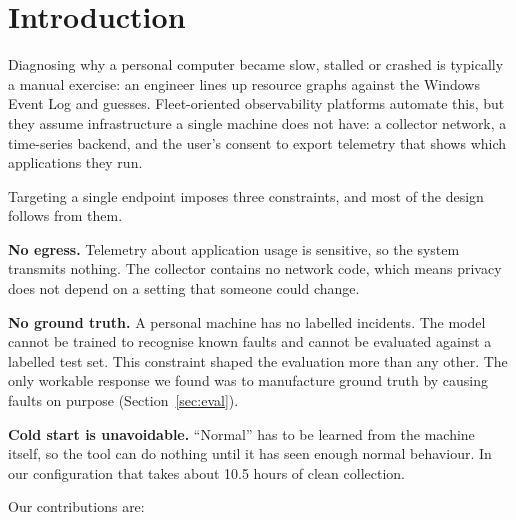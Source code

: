 \documentclass[conference]{IEEEtran}
\begin{document}
\section{Introduction}

Diagnosing why a personal computer became slow, stalled or crashed is
typically a manual exercise: an engineer lines up resource graphs against the
Windows Event Log and guesses. Fleet-oriented observability platforms automate
this, but they assume infrastructure a single machine does not have: a
collector network, a time-series backend, and the user's consent to export
telemetry that shows which applications they run.

Targeting a single endpoint imposes three constraints, and most of the design
follows from them.

\textbf{No egress.} Telemetry about application usage is sensitive, so the
system transmits nothing. The collector contains no network code, which means
privacy does not depend on a setting that someone could change.

\textbf{No ground truth.} A personal machine has no labelled incidents. The
model cannot be trained to recognise known faults and cannot be evaluated
against a labelled test set. This constraint shaped the evaluation more than
any other. The only workable response we found was to manufacture ground truth
by causing faults on purpose (Section~\ref{sec:eval}).

\textbf{Cold start is unavoidable.} ``Normal'' has to be learned from the
machine itself, so the tool can do nothing until it has seen enough normal
behaviour. In our configuration that takes about 10.5 hours of clean
collection.

Our contributions are:
\end{document}
